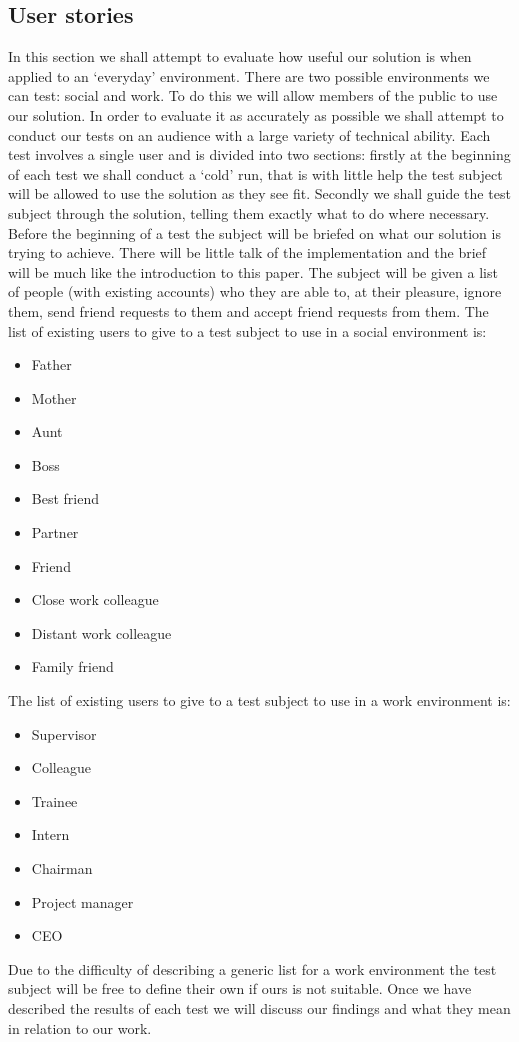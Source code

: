 \documentclass[12pt, titlepage]{article}
\begin{document}
\subsection{User stories}
In this section we shall attempt to evaluate how useful our solution is when applied to an `everyday' environment. There are two possible environments we can test: social and work. To do this we will allow members of the public to use our solution. In order to evaluate it as accurately as possible we shall attempt to conduct our tests on an audience with a large variety of technical ability.
\newline \indent Each test involves a single user and is divided into two sections: firstly at the beginning of each test we shall conduct a `cold' run, that is with little help the test subject will be allowed to use the solution as they see fit. Secondly we shall guide the test subject through the solution, telling them exactly what to do where necessary.
\newline \indent Before the beginning of a test the subject will be briefed on what our solution is trying to achieve. There will be little talk of the implementation and the brief will be much like the introduction to this paper. The subject will be given a list of people (with existing accounts) who they are able to, at their pleasure, ignore them, send friend requests to them and accept friend requests from them.
\newline The list of existing users to give to a test subject to use in a social environment is:
\begin{itemize}
	\item Father
	\item Mother
	\item Aunt
	\item Boss
	\item Best friend
	\item Partner
	\item Friend
	\item Close work colleague
	\item Distant work colleague
	\item Family friend	
\end{itemize}

The list of existing users to give to a test subject to use in a work environment is:
\begin{itemize}
	\item Supervisor
	\item Colleague
	\item Trainee
	\item Intern
	\item Chairman
	\item Project manager
	\item CEO
\end{itemize}
Due to the difficulty of describing a generic list for a work environment the test subject will be free to define their own if ours is not suitable.
\newline Once we have described the results of each test we will discuss our findings and what they mean in relation to our work.
\end{document}
